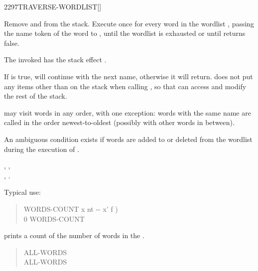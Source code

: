 
\begin{worddef}{2297}{TRAVERSE-WORDLIST}[]%
\item {}

	Remove  and  from the stack.  Execute
	 once for every word in the wordlist ,
	passing the name token  of the word to ,
	until the wordlist is exhausted or until  returns false.

	The invoked  has the stack effect
	.

	If  is true,  will continue
	with the next name, otherwise it will return.  
	does not put any items other than  on the stack when
	calling , so that  can access and modify the
	rest of the stack.

	 may visit words in any order, with one
	exception: words with the same name are called in the order
	newest-to-oldest (possibly with other words in between).

	An ambiguous condition exists if words are added to or deleted from
	the wordlist  during the execution of
	.

\see {},
	, \\
	,
	.

	\begin{rationale}
		Typical use:

		\begin{quote}\ttfamily
 			\word{:} WORDS-COUNT  x nt -{}- x' f )
				  
			\word{;}
		\\
			0  WORDS-COUNT
			 
		\end{quote}

		prints a count of the number of words in the .

		\begin{quote}\ttfamily
			\word{:} ALL-WORDS
				   
			\word{;}
		\\
			 ALL-WORDS 
		\end{quote}
 

\end{rationale}
\end{worddef}
